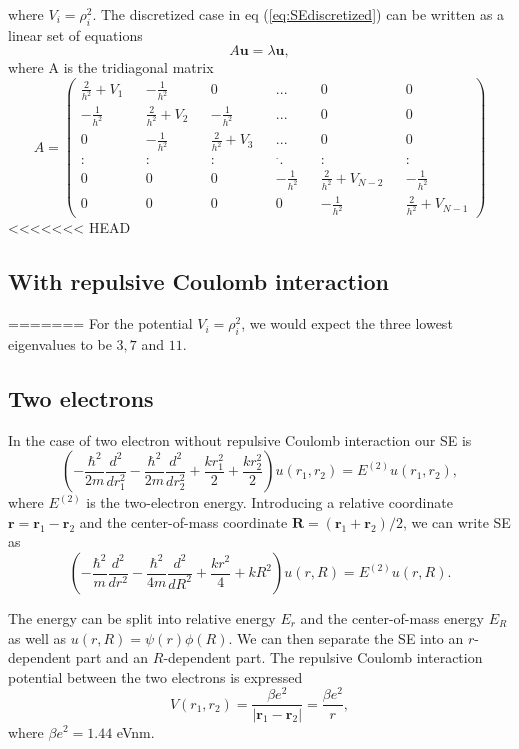 \documentclass[norsk,a4paper,12pt]{article}
\begin{document}
where $V_i=\rho_i^2$.
The discretized case in eq (\ref{eq:SEdiscretized}) can be written as a linear set of equations 
\begin{equation}
A\textbf{u} = \lambda \textbf{u},
\label{eq:Aulambdau}
\end{equation}
where A is the tridiagonal matrix
\setcounter{MaxMatrixCols}{20}
\begin{equation}
A=\begin{pmatrix}
\frac{2}{h^2} + V_1 && -\frac{1}{h^2} && 0 && ... && 0 && 0 \\
-\frac{1}{h^2} && \frac{2}{h^2} + V_2 && -\frac{1}{h^2} && ... && 0 && 0 \\
0 && -\frac{1}{h^2} && \frac{2}{h^2} + V_3 && ... && 0 && 0 \\
: && : && : && ^{\textbf{.}}. && : && : \\
0 && 0 && 0 && -\frac{1}{h^2} && \frac{2}{h^2} + V_{N-2} && -\frac{1}{h^2} \\
0 && 0 && 0 && 0 && -\frac{1}{h^2} && \frac{2}{h^2} + V_{N-1}
\end{pmatrix}
\label{eq:A}
\end{equation}
<<<<<<< HEAD
\subsection{With repulsive Coulomb interaction}
=======
For the potential $V_i = \rho_i^2$, we would expect the three lowest eigenvalues to be $3, 7$ and $11$.
\subsection{Two electrons}
In the case of two electron without repulsive Coulomb interaction our SE is 
$$\left(-\frac{\hbar ^2}{2m}\frac{d^2}{dr_1^2} - \frac{\hbar ^2}{2m}\frac{d^2}{dr_2^2} + \frac{kr_1^2}{2} + \frac{kr_2^2}{2}\right)u(r_1,r_2) = E^{(2)}u(r_1,r_2),$$
where $E^{(2)}$ is the two-electron energy. Introducing a relative coordinate $\textbf{r} = \textbf{r}_1-\textbf{r}_2$ and the center-of-mass coordinate $\textbf{R} = (\textbf{r}_1 + \textbf{r}_2)/2$, we can write SE as
$$\left(-\frac{\hbar ^2}{m}\frac{d^2}{dr^2} - \frac{\hbar ^2}{4m}\frac{d^2}{dR^2} + \frac{kr^2}{4} + kR^2\right)u(r,R) = E^{(2)}u(r,R).$$


The energy can be split into relative energy $E_r$ and the center-of-mass energy $E_R$ as well as $u(r,R) = \psi(r) \phi(R)$. We can then separate the SE into an $r$-dependent part and an $R$-dependent part. The repulsive Coulomb interaction potential between the two electrons is expressed $$V(r_1,r_2) = \frac{\beta e^2}{|\textbf{r}_1-\textbf{r}_2|} = \frac{\beta e^2}{r},$$ where $\beta e^2 = 1.44$ eVnm. 
\end{document}
